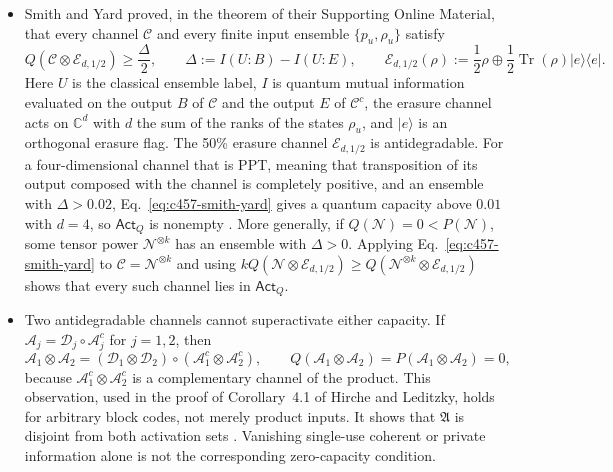 \begin{itemize}
  \item Smith and Yard proved, in the theorem of their Supporting Online Material, that every channel $\mathcal C$ and every finite input ensemble $\{p_u,\rho_u\}$ satisfy
\begin{equation}
 Q(\mathcal C\otimes\mathcal E_{d,1/2})\geq\frac{\Delta}{2},
 \qquad
 \Delta:=I(U:B)-I(U:E),
 \qquad
 \mathcal E_{d,1/2}(\rho):=\frac12\rho\oplus\frac12\operatorname{Tr}(\rho)|e\rangle\langle e|.
 \label{eq:c457-smith-yard}
\end{equation}
Here $U$ is the classical ensemble label, $I$ is quantum mutual information evaluated on the output $B$ of $\mathcal C$ and the output $E$ of $\mathcal C^c$, the erasure channel acts on $\mathbb C^d$ with $d$ the sum of the ranks of the states $\rho_u$, and $|e\rangle$ is an orthogonal erasure flag. The 50\% erasure channel $\mathcal E_{d,1/2}$ is antidegradable. For a four-dimensional channel that is PPT, meaning that transposition of its output composed with the channel is completely positive, and an ensemble with $\Delta>0.02$, Eq.~\eqref{eq:c457-smith-yard} gives a quantum capacity above $0.01$ with $d=4$, so $\mathsf{Act}_Q$ is nonempty . More generally, if $Q(\mathcal N)=0<P(\mathcal N)$, some tensor power $\mathcal N^{\otimes k}$ has an ensemble with $\Delta>0$. Applying Eq.~\eqref{eq:c457-smith-yard} to $\mathcal C=\mathcal N^{\otimes k}$ and using $kQ(\mathcal N\otimes\mathcal E_{d,1/2})\geq Q(\mathcal N^{\otimes k}\otimes\mathcal E_{d,1/2})$ shows that every such channel lies in $\mathsf{Act}_Q$.

  \item Two antidegradable channels cannot superactivate either capacity. If $\mathcal A_j=\mathcal D_j\circ\mathcal A_j^c$ for $j=1,2$, then
\begin{equation}
 \mathcal A_1\otimes\mathcal A_2=(\mathcal D_1\otimes\mathcal D_2)\circ(\mathcal A_1^c\otimes\mathcal A_2^c),
 \qquad
 Q(\mathcal A_1\otimes\mathcal A_2)=P(\mathcal A_1\otimes\mathcal A_2)=0,
 \label{eq:c457-antidegradable-products}
\end{equation}
because $\mathcal A_1^c\otimes\mathcal A_2^c$ is a complementary channel of the product. This observation, used in the proof of Corollary~4.1 of Hirche and Leditzky, holds for arbitrary block codes, not merely product inputs. It shows that $\mathfrak A$ is disjoint from both activation sets . Vanishing single-use coherent or private information alone is not the corresponding zero-capacity condition.


\end{itemize}
